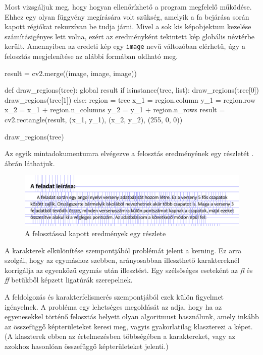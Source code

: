 Most vizsgáljuk meg, hogy hogyan ellenőrízhető a program megfelelő működése.
Ehhez egy olyan függvény megírására volt szükség, amelyik a fa bejárása során kapott régiókat rekurzívan be tudja járni.
Mivel a sok kis képobjektum kezelése számításigényes lett volna, ezért az eredményként tekintett kép globális névtérbe került.
Amennyiben az eredeti kép egy \texttt{image} nevű változóban elérhetű, úgy a felosztás megjelenítése az alábbi formában oldható meg.
\begin{python}
result = cv2.merge((image, image, image))

def draw_regions(tree):
    global result
    if isinstance(tree, list):
        draw_regions(tree[0])
        draw_regions(tree[1])
    else:
        region = tree
        x_1 = region.column
        y_1 = region.row
        x_2 = x_1 + region.n_columns
        y_2 = y_1 + region.n_rows
        result =
            cv2.rectangle(result, (x_1, y_1), (x_2, y_2), (255, 0, 0))

draw_regions(tree)
\end{python}
Az egyik mintadokumentumra elvégezve a felosztás eredményének egy részletét . ábrán láthatjuk.

\begin{figure}[h!]
\centering
\includegraphics[width=\textwidth]{images/splitted.png}
\caption{A felosztással kapott eredmények egy részlete}
\label{fig:splitted}
\end{figure}


A karakterek elkülönítése szempontjából problémát jelent a kerning. Ez arra szolgál, hogy az egymáshoz szebben, arányosabban illeszthető karaktereknél korrigálja az egyenközű egymás után illesztést. Egy szélsőséges eseteként az \emph{fl} és \emph{ff} betűkből képzett ligatúrák szerepelnek.

A feldolgozás és karakterfelismerés szempontjából ezek külön figyelmet igényelnek.
A probléma egy lehetséges megoldását az adja, hogy ha az egyenesekkel történő felosztás helyett olyan algoritmust használunk, amely inkább az összefüggő képterületeket keresi meg, vagyis gyakorlatilag klaszterezi a képet. (A klaszterek ebben az értelmezésben többségében a karaktereket, vagy az azokhoz hasonlóan összefüggő képterületeket jelenti.)

